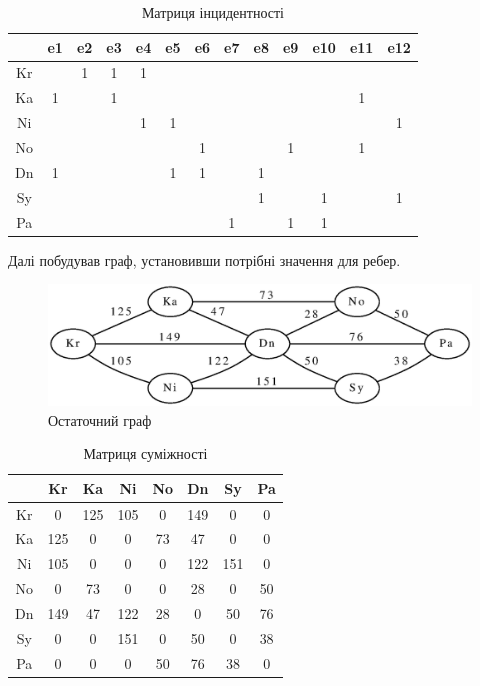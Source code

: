 \documentclass[a4paper, 12pt, oneside]{extarticle}
\begin{document}
\begin{table}[h]
	\centering
	\begin{tabular}{c|c|c|c|c|c|c|c|c|c|c|c|c}
		&e1	&e2	&e3	&e4	&e5	&e6	&e7	&e8	&e9	&e10	&e11	&e12 \\
		\hline
		Kr &	&1	&1	&1	&	&	&	&	&	&	&	&\\
		\hline
		Ka &1	&	&1	&	&	&	&	&	&	&	&1	& \\
		\hline
		Ni &	&	&	&1	&1	&	&	&	&	&	&	&1 \\
		\hline
		No &	&	&	&	&	&1	&	&	&1	&	&1	& \\
		\hline
		Dn &1	&	&	&	&1	&1	&	&1	&	&	&	& \\
		\hline
		Sy &	&	&	&	&	&	&	&1	&	&1	&	&1 \\
		\hline
		Pa &	&	&	&	&	&	&1	&	&1	&1	&	& \\
	\end{tabular}
	\caption{Матриця інцидентності}
\end{table}


Далі побудував граф, установивши потрібні значення для ребер.

\begin{figure}[h]
	\centering
	\includegraphics[width=.7\textwidth]{graph}
	\caption{Остаточний граф}
\end{figure}

\begin{table}[H]
	\centering
	\begin{tabular}{c|c|c|c|c|c|c|c }
		& Kr & Ka & Ni & No & Dn & Sy & Pa \\
		\hline
		Kr & 0 & 125 & 105 & 0 & 149 & 0 & 0 \\
		\hline
		Ka & 125 & 0 & 0 & 73 & 47 & 0 & 0 \\
		\hline
		Ni & 105 & 0 & 0 & 0 & 122 & 151 & 0 \\
		\hline
		No & 0 & 73 & 0 & 0 & 28 & 0 & 50 \\
		\hline
		Dn & 149 & 47 & 122 & 28 & 0 & 50 & 76 \\
		\hline
		Sy & 0 & 0 & 151 & 0 & 50 & 0 & 38 \\
		\hline
		Pa & 0 & 0 & 0 & 50 & 76 & 38 & 0 \\
	\end{tabular}
	\caption{Матриця суміжності}
\end{table}
\end{document}
